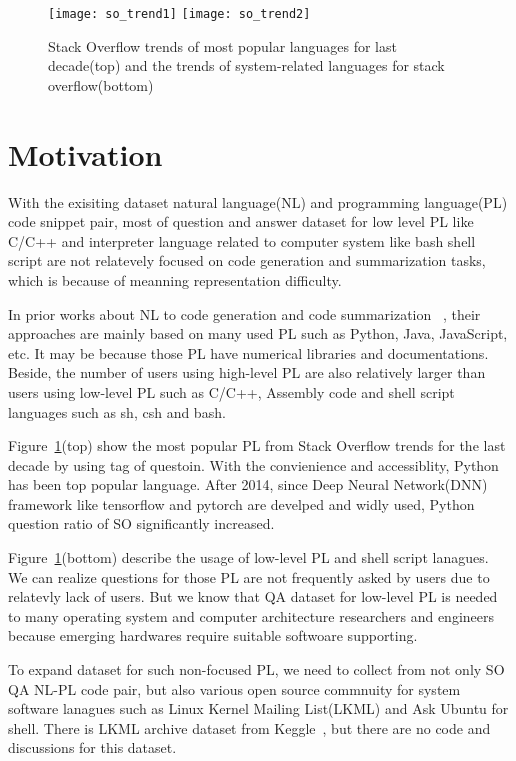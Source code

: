 \begin{figure}[t]
\centering
\texttt{[image: so\_trend1]}
\texttt{[image: so\_trend2]}
\caption{Stack Overflow trends of most popular languages for last
decade(top) and the trends of system-related languages for stack
overflow(bottom)}
\label{fig:so_trend}
\end{figure}

\section{Motivation}
With the exisiting dataset natural language(NL) and programming language(PL) code 
snippet pair, most of question and answer dataset for low level PL like C/C++
and interpreter language related to computer system like bash shell script are
not relatevely focused on code generation and summarization tasks,
which is because of meanning representation difficulty.

In prior works about NL to code generation and code summarization
~\cite{xu20aclcodegen, orlanski2021reading, yin2018mining, parvez2021retrieval,
feng2020codebert}, their approaches are mainly
based on many used PL such as Python, Java, JavaScript, etc. It
may be because those PL have numerical libraries and documentations. Beside, the
number of users using high-level PL are also relatively larger than users using
low-level PL such as C/C++, Assembly code and shell script languages such as sh,
csh and bash.

Figure~\ref{fig:so_trend}(top) show the most popular PL from Stack Overflow trends
for the last decade by using tag of questoin. With the convienience and
accessiblity, Python has been top popular language. After 2014, since Deep
Neural Network(DNN) framework like tensorflow and pytorch are develped and
widly used, Python question ratio of SO significantly increased.

Figure~\ref{fig:so_trend}(bottom) describe the usage of
low-level PL and shell script lanagues. We can realize questions for those PL
are not frequently asked by users due to relatevly lack of users. But we know
that QA dataset for low-level PL is needed to many operating system and computer
architecture researchers and engineers because emerging hardwares require
suitable softwoare supporting.

To expand dataset for such non-focused PL, we need to collect
from not only SO QA NL-PL code pair, but also various open source commnuity for
system software lanagues such as Linux Kernel Mailing List(LKML) and Ask Ubuntu
for shell. There is LKML archive dataset from
Keggle~\cite{miasoedov2017lkmlarchive}, but there are no code and discussions
for this dataset.

